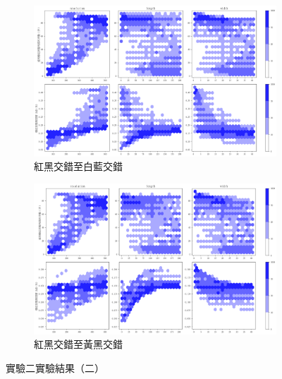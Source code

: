 \documentclass[12pt]{article}
\begin{document}
\begin{figure}[htbp]
  \centering
  \begin{subfigure}[b]{0.9\textwidth}
    \centering
    \includegraphics[width=\textwidth]{img/OutputImg/_Blank_RB.png}
    \caption{紅黑交錯至白藍交錯}
  \end{subfigure}

  \begin{subfigure}[b]{0.9\textwidth}
    \centering
    \includegraphics[width=\textwidth]{img/OutputImg/_Blank_RY.png}
    \caption{紅黑交錯至黃黑交錯}
  \end{subfigure}

  \caption{實驗二實驗結果（二）}\label{fig:result_3}

\end{figure}
\end{document}
